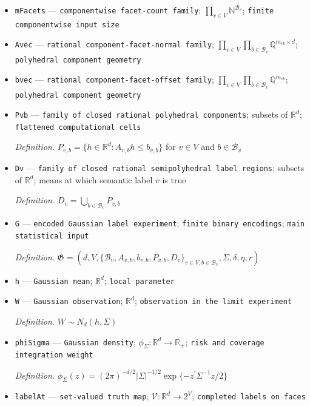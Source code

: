\documentclass{article}
\begin{document}
\begin{itemize}
  \item \texttt{mFacets} --- \texttt{componentwise facet-\allowbreak{}count family}; \(\prod_{v\in V}\mathbb N^{\mathcal B_v}\); \texttt{finite componentwise input size}
  \item \texttt{Avec} --- \texttt{rational component-\allowbreak{}facet-\allowbreak{}normal family}; \(\prod_{v\in V}\prod_{b\in\mathcal B_v}\mathbb Q^{m_{vb}\times d}\); \texttt{polyhedral component geometry}
  \item \texttt{bvec} --- \texttt{rational component-\allowbreak{}facet-\allowbreak{}offset family}; \(\prod_{v\in V}\prod_{b\in\mathcal B_v}\mathbb Q^{m_{vb}}\); \texttt{polyhedral component geometry}
  \item \texttt{Pvb} --- \texttt{family of closed rational polyhedral components}; subsets of \(\mathbb R^d\); \texttt{flattened computational cells}
  \par\smallskip\noindent\emph{Definition.} \(P_{v,b}=\{h\in\mathbb R^d:A_{v,b}h\le b_{v,b}\}\) for \(v\in V\) and \(b\in\mathcal B_v\)
  \item \texttt{Dv} --- \texttt{family of closed rational semipolyhedral label regions}; subsets of \(\mathbb R^d\); means at which semantic label \(v\) is true
  \par\smallskip\noindent\emph{Definition.} \(D_v=\bigcup_{b\in\mathcal B_v}P_{v,b}\)
  \item \texttt{G} --- \texttt{encoded Gaussian label experiment}; \texttt{finite binary encodings}; \texttt{main statistical input}
  \par\smallskip\noindent\emph{Definition.} \(\mathfrak G=(d,V,\{\mathcal B_v,A_{v,b},b_{v,b},P_{v,b},D_v\}_{v\in V,b\in\mathcal B_v},\Sigma,\delta,\eta,r)\)
  \item \texttt{h} --- \texttt{Gaussian mean}; \(\mathbb R^d\); \texttt{local parameter}
  \item \texttt{W} --- \texttt{Gaussian observation}; \(\mathbb R^d\); \texttt{observation in the limit experiment}
  \par\smallskip\noindent\emph{Definition.} \(W\sim N_d(h,\Sigma)\)
  \item \texttt{phiSigma} --- \texttt{Gaussian density}; \(\phi_{\Sigma}:\mathbb R^d\to\mathbb R_{+}\); \texttt{risk and coverage integration weight}
  \par\smallskip\noindent\emph{Definition.} \(\phi_{\Sigma}(z)=(2\pi)^{-d/2}|\Sigma|^{-1/2}\exp\{-z^{\prime}\Sigma^{-1}z/2\}\)
  \item \texttt{labelAt} --- \texttt{set-\allowbreak{}valued truth map}; \(\mathcal V:\mathbb R^d\to2^V\); \texttt{completed labels on faces}

\end{itemize}
\end{document}
